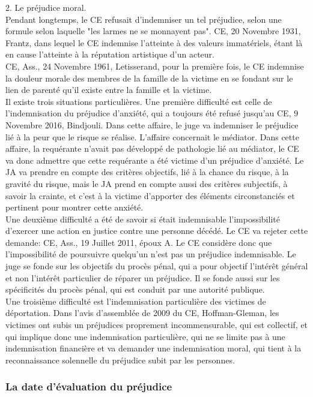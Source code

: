 \documentclass[10pt, a4paper, openany]{book}
\begin{document}
2. Le préjudice moral. \\
Pendant longtemps, le CE refusait d'indemniser un tel préjudice, selon une formule selon laquelle "les larmes ne se monnayent pas". CE, 20 Novembre 1931, Frantz, dans lequel le CE indemnise l'atteinte à des valeurs immatériels, étant là en cause l'atteinte à la réputation artistique d'un acteur. \\
CE, Ass., 24 Novembre 1961, Letisserand, pour la première fois, le CE indemnise la douleur morale des membres de la famille de la victime en se fondant sur le lien de parenté qu'il existe entre la famille et la victime. \\
Il existe trois situations particulières. Une première difficulté est celle de l'indemnisation du préjudice d'anxiété, qui a toujours été refusé jusqu'au CE, 9 Novembre 2016, Bindjouli. Dans cette affaire, le juge va indemniser le préjudice lié à la peur que le risque se réalise. L'affaire concernait le médiator. Dans cette affaire, la requérante n'avait pas développé de pathologie lié au médiator, le CE va donc admettre que cette requérante a été victime d'un préjudice d'anxiété. Le JA va prendre en compte des critères objectifs, lié à la chance du risque, à la gravité du risque, mais le JA prend en compte aussi des critères subjectifs, à savoir la crainte, et c'est à la victime d'apporter des éléments circonstanciés et pertinent pour montrer cette anxiété. \\
Une deuxième difficulté a été de savoir si était indemnisable l'impossibilité d'exercer une action en justice contre une personne décédé. Le CE va rejeter cette demande: CE, Ass., 19 Juillet 2011, époux A. Le CE considère donc que l'impossibilité de poursuivre quelqu'un n'est pas un préjudice indemnisable. Le juge se fonde sur les objectifs du procès pénal, qui a pour objectif l'intérêt général et non l'intérêt particulier de réparer un préjudice. Il se fonde aussi sur les spécificités du procès pénal, qui est conduit par une autorité publique. \\
Une troisième difficulté est l'indemnisation particulière des victimes de déportation. Dans l'avis d'assemblée de 2009 du CE, Hoffman-Gleman, les victimes ont subis un préjudices proprement incommensurable, qui est collectif, et qui implique donc une indemnisation particulière, qui ne se limite pas à une indemnisation financière et va demander une indemnisation moral, qui tient à la reconnaissance solennelle du préjudice subit par les personnes. 

\subsubsection{La date d'évaluation du préjudice}
\end{document}
